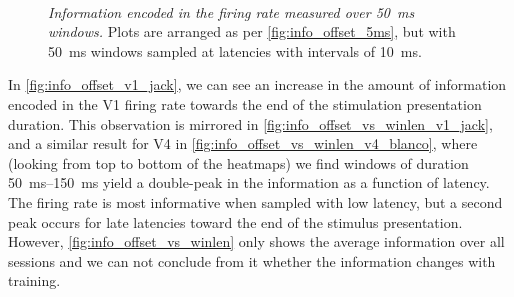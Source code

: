 \begin{figure}[htbp]%
    \centering
    \hspace*{\fill}
    \hspace*{\fill}\hspace{.2cm}\hspace*{\fill}
    \hspace*{\fill}
    \\
    \hspace*{\fill}
    \hspace*{\fill}\hspace{.2cm}\hspace*{\fill}
    \hspace*{\fill}
    \caption{\textit{Information encoded in the firing rate measured over \SI{50}{\milli\second} windows.}
Plots are arranged as per \autoref{fig:info_offset_5ms}, but with \SI{50}{\milli\second} windows sampled at latencies with intervals of \SI{10}{\milli\second}.
    \label{fig:info_offset}
}
\end{figure}

In \autoref{fig:info_offset_v1_jack}, we can see an increase in the amount of information encoded in the \ac{V1} firing rate towards the end of the stimulation presentation duration.
This observation is mirrored in \autoref{fig:info_offset_vs_winlen_v1_jack}, and a similar result for \ac{V4} in \autoref{fig:info_offset_vs_winlen_v4_blanco}, where (looking from top to bottom of the heatmaps) we find windows of duration \SIrange{50}{150}{\milli\second} yield a double-peak in the information as a function of latency.
The firing rate is most informative when sampled with low latency, but a second peak occurs for late latencies toward the end of the stimulus presentation.
However, \autoref{fig:info_offset_vs_winlen} only shows the average information over all sessions and we can not conclude from it whether the information changes with training.


